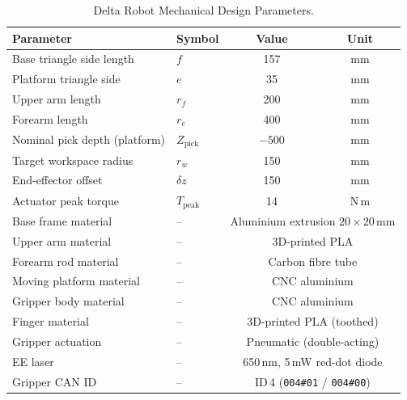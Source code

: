 \begin{table}[h]
    \centering
    \caption{Delta Robot Mechanical Design Parameters.}
    \label{tab:mechanical_params}
    \begin{tabular}{llcc}
        \hline
        \textbf{Parameter} & \textbf{Symbol} &
        \textbf{Value} & \textbf{Unit} \\
        \hline
        Base triangle side length   & $f$
            & 157     & mm \\
        Platform triangle side      & $e$
            & 35      & mm \\
        Upper arm length            & $r_f$
            & 200     & mm \\
        Forearm length              & $r_e$
            & 400     & mm \\
        Nominal pick depth (platform) & $Z_{\text{pick}}$
            & $-500$  & mm \\
        Target workspace radius     & $r_w$
            & 150     & mm \\
        End-effector offset         & $\delta z$
            & 150     & mm \\
        Actuator peak torque        & $T_{\text{peak}}$
            & 14      & N\,m \\
        \hline
        Base frame material         & --
            & \multicolumn{2}{c}{Aluminium extrusion
              $20 \times 20$\,mm} \\
        Upper arm material          & --
            & \multicolumn{2}{c}{3D-printed PLA} \\
        Forearm rod material        & --
            & \multicolumn{2}{c}{Carbon fibre tube} \\
        Moving platform material    & --
            & \multicolumn{2}{c}{CNC aluminium} \\
        Gripper body material       & --
            & \multicolumn{2}{c}{CNC aluminium} \\
        Finger material             & --
            & \multicolumn{2}{c}{3D-printed PLA (toothed)} \\
        Gripper actuation           & --
            & \multicolumn{2}{c}{Pneumatic (double-acting)} \\
        EE laser                    & --
            & \multicolumn{2}{c}{650\,nm, 5\,mW red-dot diode} \\
        Gripper CAN ID              & --
            & \multicolumn{2}{c}{ID\,4
              (\texttt{004\#01} / \texttt{004\#00})} \\
        \hline
    \end{tabular}
\end{table}


